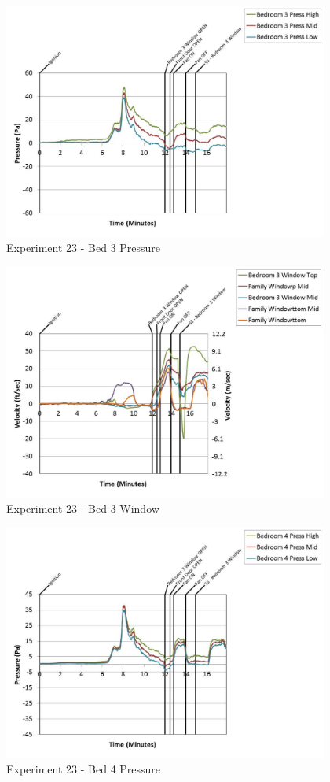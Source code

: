 \documentclass{article}
\begin{document}
\begin{appendices}
	\begin{figure}[h!]
		\centering
		\includegraphics[height=3.05in]{0_Images/Results_Charts/Exp_23_Charts/Bed3Pressure.pdf}
		\caption{Experiment 23 - Bed 3 Pressure}
	\end{figure}
 
	\clearpage

	\begin{figure}[h!]
		\centering
		\includegraphics[height=3.05in]{0_Images/Results_Charts/Exp_23_Charts/Bed3Window.pdf}
		\caption{Experiment 23 - Bed 3 Window}
	\end{figure}
 

	\begin{figure}[h!]
		\centering
		\includegraphics[height=3.05in]{0_Images/Results_Charts/Exp_23_Charts/Bed4Pressure.pdf}
		\caption{Experiment 23 - Bed 4 Pressure}
	\end{figure}
 

\end{appendices}
\end{document}
